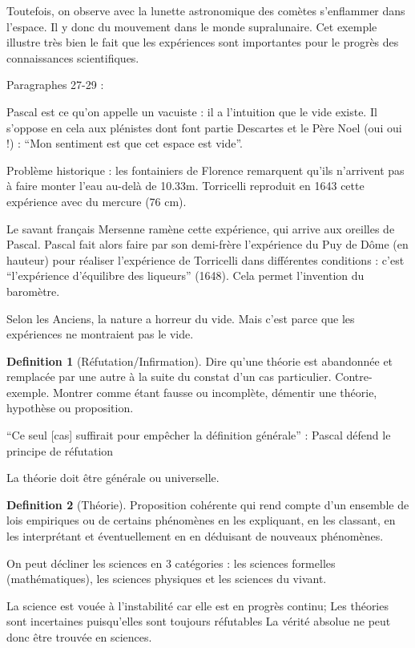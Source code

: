 \documentclass[french]{book}
\theoremstyle{definition}
\newtheorem*{dfn}{Definition}
\begin{document}
Toutefois, on observe avec la lunette astronomique des comètes s’enflammer dans l’espace. Il y donc du mouvement dans le monde supralunaire. Cet exemple illustre très bien le fait que les expériences sont importantes pour le progrès des connaissances scientifiques.

Paragraphes 27-29 :

Pascal est ce qu’on appelle un vacuiste : il a l’intuition que le vide existe. Il s’oppose en cela aux plénistes dont font partie Descartes et le Père Noel (oui oui !) : “Mon sentiment est que cet espace est vide”.

Problème historique : les fontainiers de Florence remarquent qu’ils n’arrivent pas à faire monter l’eau au-delà de 10.33m. Torricelli reproduit en 1643 cette expérience avec du mercure (76 cm).

Le savant français Mersenne ramène cette expérience, qui arrive aux oreilles de Pascal. Pascal fait alors faire par son demi-frère l’expérience du Puy de Dôme (en hauteur) pour réaliser l’expérience de Torricelli dans différentes conditions :  c’est “l'expérience d’équilibre des liqueurs” (1648). Cela permet l’invention du baromètre.

Selon les Anciens, la nature a horreur du vide. Mais c’est parce que les expériences ne montraient pas le vide.

\begin{dfn}[Réfutation/Infirmation]
Dire qu'une théorie est abandonnée et remplacée par une autre à la suite du constat d'un cas particulier. Contre-exemple. Montrer comme étant fausse ou incomplète, démentir une théorie, hypothèse ou proposition.
\end{dfn}


“Ce seul [cas] suffirait pour empêcher la définition générale” : Pascal  défend le principe de réfutation

La théorie doit être générale ou universelle.

\begin{dfn}[Théorie]
Proposition cohérente qui rend compte d’un ensemble de lois empiriques ou de certains phénomènes en les expliquant, en les classant, en les interprétant et éventuellement en en déduisant de nouveaux phénomènes.
\end{dfn}


On peut décliner les sciences en 3 catégories : les sciences formelles (mathématiques), les sciences physiques et les sciences du vivant.

La science est vouée à l’instabilité car elle est en progrès continu; Les théories sont incertaines puisqu’elles sont toujours réfutables La vérité absolue ne peut donc être trouvée en sciences.
\end{document}

